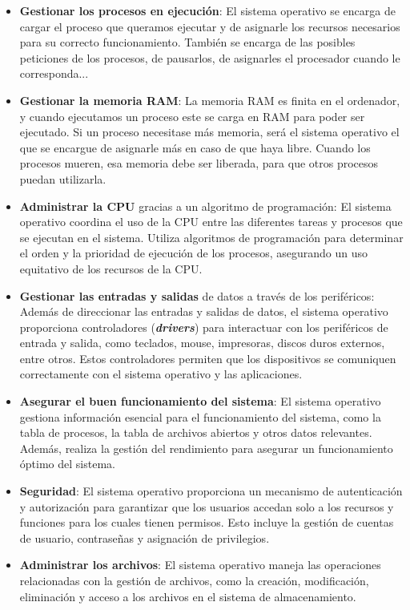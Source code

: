 \begin{itemize}
    \item \textbf{Gestionar los procesos en ejecución}: El sistema operativo se encarga de cargar el proceso que queramos ejecutar y de asignarle los recursos necesarios para su correcto funcionamiento. También se encarga de las posibles peticiones de los procesos, de pausarlos, de asignarles el procesador cuando le corresponda...

    \item \textbf{Gestionar la memoria RAM}: La memoria RAM es finita en el ordenador, y cuando ejecutamos un proceso este se carga en RAM para poder ser ejecutado. Si un proceso necesitase más memoria, será el sistema operativo el que se encargue de asignarle más en caso de que haya libre. Cuando los procesos mueren, esa memoria debe ser liberada, para que otros procesos puedan utilizarla.

    \item \textbf{Administrar la CPU} gracias a un algoritmo de programación: El sistema operativo coordina el uso de la CPU entre las diferentes tareas y procesos que se ejecutan en el sistema. Utiliza algoritmos de programación para determinar el orden y la prioridad de ejecución de los procesos, asegurando un uso equitativo de los recursos de la CPU.

    \item \textbf{Gestionar las entradas y salidas} de datos a través de los periféricos: Además de direccionar las entradas y salidas de datos, el sistema operativo proporciona controladores (\textbf{\textit{drivers}}) para interactuar con los periféricos de entrada y salida, como teclados, mouse, impresoras, discos duros externos, entre otros. Estos controladores permiten que los dispositivos se comuniquen correctamente con el sistema operativo y las aplicaciones.

    \item \textbf{Asegurar el buen funcionamiento del sistema}: El sistema operativo gestiona información esencial para el funcionamiento del sistema, como la tabla de procesos, la tabla de archivos abiertos y otros datos relevantes. Además, realiza la gestión del rendimiento para asegurar un funcionamiento óptimo del sistema.

    \item \textbf{Seguridad}: El sistema operativo proporciona un mecanismo de autenticación y autorización para garantizar que los usuarios accedan solo a los recursos y funciones para los cuales tienen permisos. Esto incluye la gestión de cuentas de usuario, contraseñas y asignación de privilegios.

    \item \textbf{Administrar los archivos}: El sistema operativo maneja las operaciones relacionadas con la gestión de archivos, como la creación, modificación, eliminación y acceso a los archivos en el sistema de almacenamiento.
\end{itemize}


